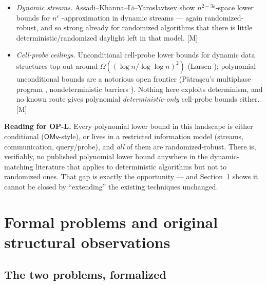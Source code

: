 \documentclass[11pt]{article}
\theoremstyle{definition}
\theoremstyle{remark}
\newcommand{\statusV}{\textcolor{green!45!black}{\textsf{[V]}}}
\newcommand{\statusM}{\textcolor{orange!80!black}{\textsf{[M]}}}
\newcommand{\OMv}{\mathsf{OMv}}
\newcommand{\eps}{\varepsilon}
\begin{document}
\begin{itemize}[itemsep=3pt]
$n^{\beta}$ is the RS density available to the construction. This is a
\emph{distributional} (hence randomized-robust) communication argument
in a \emph{bounded-space} model. \statusV
\item \emph{Dynamic streams.} Assadi--Khanna--Li--Yaroslavtsev
\cite{AKLY16} show $n^{2-3\eps}$-space lower bounds for $n^{\eps}$%
-approximation in dynamic streams --- again randomized-robust, and so
strong already for randomized algorithms that there is little
deterministic/randomized daylight left in that model. \statusM
\item \emph{Cell-probe ceilings.} Unconditional cell-probe lower bounds
for dynamic data structures top out around
$\Omega((\log n/\log\log n)^2)$ (Larsen \cite{Lar12}); polynomial
unconditional bounds are a notorious open frontier (P\u{a}tra\c{s}cu's
multiphase program \cite{Pat10}, nondeterministic barriers
\cite{CGL15}). Nothing here exploits determinism, and no known route
gives polynomial \emph{deterministic-only} cell-probe bounds either.
\statusM
\end{itemize}

\noindent\textbf{Reading for OP-L.} Every polynomial lower bound in this
landscape is either conditional ($\OMv$-style), or lives in a restricted
information model (streams, communication, query/probe), and \emph{all}
of them are randomized-robust. There is, verifiably, no published
polynomial lower bound anywhere in the dynamic-matching literature that
applies to deterministic algorithms but not to randomized ones. That gap
is exactly the opportunity --- and Section~\ref{sec:problems} shows it
cannot be closed by ``extending'' the existing techniques unchanged.

\section{Formal problems and original structural observations}
\label{sec:problems}

\subsection{The two problems, formalized}
\end{document}
